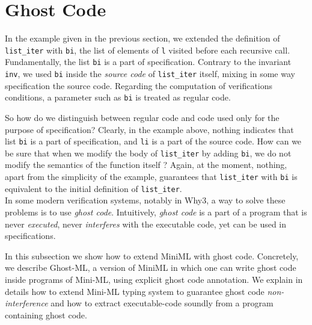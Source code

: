 \documentclass[a4paper,11pt,oneside]{article}
\theoremstyle{plain}
\begin{document}
		
	

\newpage

\section{Ghost Code}

In the example given in the previous section, we extended the definition of \texttt{list\_iter} with \texttt{bi}, the list of elements of \texttt{l} visited before each recursive call.
Fundamentally, the list \texttt{bi} is a part of specification.
Contrary to the invariant \texttt{inv}, we used \texttt{bi} inside the
\textit{source code} of \texttt{list\_iter} itself, mixing in some way
specification  the source code. Regarding the computation of
verifications conditions, a parameter such as \texttt{bi} is treated
as regular code.

So how do we distinguish between regular code and code used only for the purpose of  specification?
Clearly, in the example above, nothing indicates that list \texttt{bi} is a part of specification, and \texttt{li} is a part of the source code.
How can we be sure that when we modify the body of \texttt{list\_iter} by adding  \texttt{bi}, we do not modify the semantics of the function itself ? 
Again, at the moment, nothing, apart from the simplicity of the example, guarantees that \texttt{list\_iter} with \texttt{bi} is equivalent to the initial definition of \texttt{list\_iter}. \\ 

In some modern verification systems, notably in Why3, a way to solve
these problems is to use \textit{ghost code}.
 Intuitively, \textit{ghost code} is a part of a program that is never
 \textit{executed}, never \textit{interferes} with the executable
 code, yet can be used in specifications.



In this subsection we show how to extend MiniML with ghost code. Concretely, we describe Ghost-ML, a version of MiniML in which one can write ghost code inside programs of Mini-ML, using explicit ghost code annotation.
We explain in details how to extend Mini-ML typing system to guarantee ghost code \textit{non-interference} and how to extract executable-code soundly from a program containing ghost code.
\end{document}
